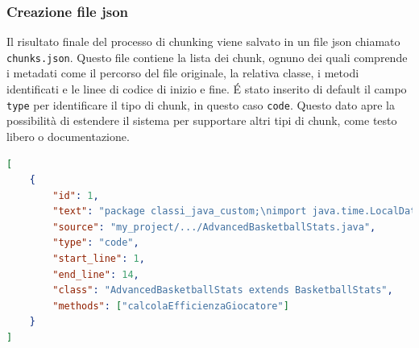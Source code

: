 \documentclass[12pt,a4paper,openright,twoside]{book}
\begin{document}
\subsubsection{Creazione file json}
Il risultato finale del processo di chunking viene salvato in un file json chiamato \texttt{chunks.json}.
Questo file contiene la lista dei chunk, ognuno dei quali comprende i metadati come il percorso del file originale, la relativa classe, i metodi identificati e le linee di codice di inizio e fine.
\'E stato inserito di default il campo \texttt{type} per identificare il tipo di chunk, in questo caso \texttt{code}.
Questo dato apre la possibilità di estendere il sistema per supportare altri tipi di chunk, come testo libero o documentazione.
\begin{lstlisting}[language=json, caption={Esempio di chunk generato}]
[
    {
        "id": 1,
        "text": "package classi_java_custom;\nimport java.time.LocalDate;...",
        "source": "my_project/.../AdvancedBasketballStats.java",
        "type": "code",
        "start_line": 1,
        "end_line": 14,
        "class": "AdvancedBasketballStats extends BasketballStats",
        "methods": ["calcolaEfficienzaGiocatore"]
    }
]
\end{lstlisting}
\end{document}
